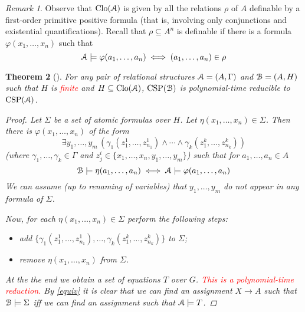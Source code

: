 \documentclass{amsart}
\theoremstyle{plain}
\newtheorem{theorem}{Theorem}[section]
\theoremstyle{definition}
\theoremstyle{remark}
\newtheorem{remark}[theorem]{Remark}
\def\phi{\varphi}
\def\E{\exists}
\DeclareMathOperator{\Clo}{Clo}
\DeclareMathOperator{\CSP}{CSP}
\begin{document}
\begin{remark}
    Observe that $\Clo(\EuScript{A})$ is given by all the relations $\rho$ of $A$ definable by a first-order primitive positive formula
    (that is, involving only conjunctions and existential quantifications). 
    Recall that $\rho \subseteq A^n$ is definable if there is a formula $\phi(x_1, \ldots, x_n)$ such that 
    \begin{equation*}
        \EuScript{A} \models \phi(a_1, \ldots, a_n) \iff (a_1, \ldots, a_n) \in \rho
    \end{equation*}
\end{remark}

\begin{theorem}[\cite{jeavons}]
    For any pair of relational structures $\EuScript{A}=(A,\Gamma)$ 
    and $\EuScript{B}=(A, H)$ 
    such that $H$ is \textcolor{red}{finite} and $H \subseteq \Clo(\EuScript{A})$, $\CSP(\EuScript{B})$ is polynomial-time reducible to $\CSP(\EuScript{A})$.
    \begin{proof}
        Let $\Sigma$ be a set of atomic formulas over $H$.  
        Let $\eta(x_1, \ldots, x_n) \in \Sigma$. 
        Then there is $\phi(x_1, \ldots, x_n)$ of the form 
        \begin{equation*}
            \E y_1, \ldots, y_m \,( \gamma_1(z^{1}_{1}, \ldots, z^{1}_{n_1}) \land \cdots \land \gamma_k(z^{k}_{1}, \ldots, z^{k}_{n_k}))
        \end{equation*} 
        (where $\gamma_1, \ldots, \gamma_k \in \Gamma$ and $z^{i}_{j} \in \{x_1, \ldots, x_n, y_1, \ldots, y_m\}$)
        such that for $a_1, \ldots, a_n \in A$ 
        \begin{equation}
            \label{equiv}
            \EuScript{B} \models \eta(a_1, \ldots, a_n)  
            \iff \EuScript{A} \models \phi(a_1, \ldots, a_n)
        \end{equation}
        We can assume (up to renaming of variables) that $y_1, \ldots, y_m$ do not appear in any formula of $\Sigma$.  

        Now, for each $\eta(x_1, \ldots, x_n) \in \Sigma$ perform the following steps: 
        \begin{itemize}
            \item add $\{\gamma_1(z^{1}_{1}, \ldots, z^{1}_{n_1}), \ldots, \gamma_k(z^{k}_{1}, \ldots, z^{k}_{n_k})\}$ to $\Sigma$; 
            \item remove $\eta(x_1, \ldots, x_n)$ from $\Sigma$. 
        \end{itemize}
        At the the end we obtain a set of equations $T$ over $G$. 
        \textcolor{red}{This is a polynomial-time reduction. 
        } 
        By \eqref{equiv} it is clear that we can find an assignment $X \to A$ such that $\EuScript{B} \models \Sigma$ iff we can find an assignment such that $\EuScript{A} \models T$.
    \end{proof} 
\end{theorem}
\end{document}
